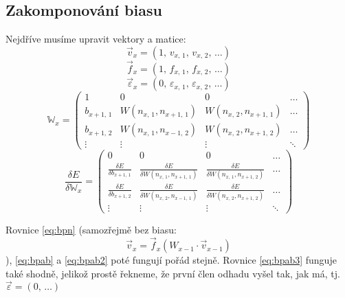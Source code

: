 \documentclass[12pt]{report}			%
\newcommand{\W}{\mathbb{W}}
\begin{document}
					\subsection{Zakomponování biasu}
					Nejdříve musíme upravit vektory a matice:
					\begin{equation} \vec{v}_x = \left(1,\,v_{x,\,1},\,v_{x,\,2},\,\ldots\right) \end{equation}
					\begin{equation} \vec{f}_x = \left(1,\,f_{x,\,1},\,f_{x,\,2},\,\ldots\right) \end{equation}
					\begin{equation} \vec{\varepsilon}_x = \left(0,\,\varepsilon_{x,\,1},\,\varepsilon_{x,\,2},\,\ldots\right) \end{equation}
					\begin{equation}
						\W_x = \begin{pmatrix}
							1 & 0 & 0 & \ldots \\
							b_{x+1,\,1} & W\left(n_{x,\,1}, n_{x+1,\,1}\right) & W\left(n_{x,\,2}, n_{x+1,\,1}\right) & \ldots \\
							b_{x+1,\,2} & W\left(n_{x,\,1}, n_{x-1,\,2}\right) & W\left(n_{x,\,2}, n_{x+1,\,2}\right) & \ldots \\
							\vdots & \vdots & \vdots & \ddots
						\end{pmatrix}
					\end{equation}
					\begin{equation}
						\frac{\delta E}{\delta \W_x} = \begin{pmatrix}
							0 & 0 & 0 & \ldots \\
							\frac{\delta E}{\delta b_{x+1,\,1}} & \frac{\delta E}{\delta W\left(n_{x,\,1}, n_{x+1,\,1}\right)} & \frac{\delta E}{\delta W\left(n_{x,\,1}, n_{x+1,\,2}\right)} & \ldots \\
							\frac{\delta E}{\delta b_{x+1,\,2}} & \frac{\delta E}{\delta W\left(n_{x,\,2}, n_{x-1,\,1}\right)} & \frac{\delta E}{\delta W\left(n_{x,\,2}, n_{x+1,\,2}\right)} & \ldots \\
							\vdots & \vdots & \vdots & \ddots
						\end{pmatrix}
					\end{equation}
					
					Rovnice \ref{eq:bpn} (samozřejmě bez biasu:
					\begin{equation} \vec{v}_x = \vec{f}_x\left(W_{x-1} \cdot \vec{v}_{x-1} \right) \label{eq:bpnb} \end{equation}
					), \ref{eq:bpab} a \ref{eq:bpab2} poté fungují pořád stejně. Rovnice \ref{eq:bpab3} funguje také shodně, jelikož prostě řekneme, že první člen odhadu vyšel tak, jak má, tj.~$\vec{\varepsilon} = \left(0,\,\ldots\right)$
				
\end{document}
